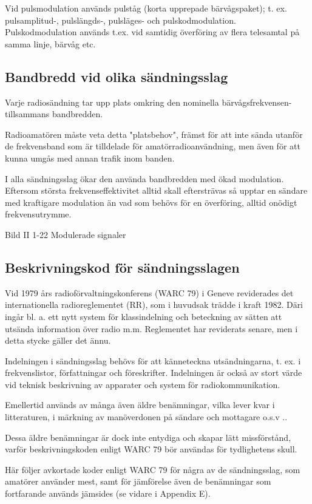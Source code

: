Vid pulsmodulation används pulståg (korta upprepade bärvågspaket); t. ex. pulsamplitud-,
pulslängds-, pulsläges- och pulskodmodulation. Pulskodmodulation används t.ex. vid
samtidig överföring av flera telesamtal på samma linje, bärvåg etc.

\subsection{Bandbredd vid olika sändningsslag}

Varje radiosändning tar upp plats omkring den nominella bärvågsfrekvensen- tillsammans
bandbredden.

Radioamatören måste veta detta "platsbehov", främst för att inte sända utanför de
frekvensband som är tilldelade för amatörradioanvändning, men även för att kunna
umgås med annan trafik inom banden.

I alla sändningsslag ökar den använda bandbredden med ökad modulation. Eftersom största
frekvenseffektivitet alltid skall eftersträvas så upptar en sändare med kraftigare
modulation än vad som behövs för en överföring, alltid onödigt frekvensutrymme.

Bild II 1-22 Modulerade signaler

\subsection{Beskrivningskod för sändningsslagen}

Vid 1979 års radioförvaltningskonferens (WARC 79) i Geneve reviderades det internationella
radioreglementet (RR), som i huvudsak trädde i kraft 1982. Däri ingår bl. a. ett nytt
system för klassindelning och beteckning av sätten att utsända information över
radio m.m. Reglementet har reviderats senare, men i detta stycke gäller det ännu.

Indelningen i sändningsslag behövs för att känneteckna utsändningarna, t. ex. i
frekvenslistor, författningar och föreskrifter. Indelningen är också av stort värde vid
teknisk beskrivning av apparater och system för radiokommunikation.

Emellertid används av många även äldre benämningar, vilka lever kvar i litteraturen, i
märkning av manöverdonen på sändare och mottagare o.s.v ..

Dessa äldre benämningar är dock inte entydiga och skapar lätt missförstånd, varför
beskrivningskoden enligt WARC 79 bör användas för tydlighetens skull.

Här följer avkortade koder enligt WARC 79 för några av de sändningsslag, som amatörer
använder mest, samt för jämförelse även de benämningar som fortfarande används jämsides
(se vidare i Appendix E).

